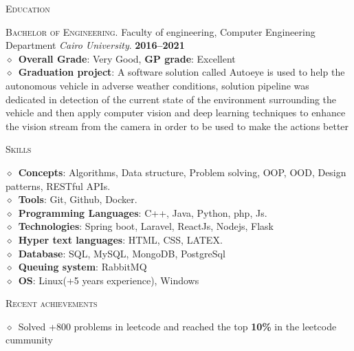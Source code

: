 \documentclass[11pt, a4paper]{article}
\newcommand{\dates}[1]{\hfill\mbox{\textbf{#1}}} %
\newcommand{\smaller}[1]{{\small$\diamond$\ #1}}
\newcommand{\headright}[1]{\vspace*{2.5ex}\textsc{\Large\color{secondColor}#1}\par%
     \vspace*{-2ex}{\color{secondColor}\hrulefill}\par}
\begin{document}
\begin{minipage}[t]{0.56\textwidth}
\headright{Education}
\textsc{Bachelor of Engineering.} Faculty of engineering, Computer Engineering Department \textit{Cairo University}.  \dates{2016--2021} \\
\smaller{\textbf{Overall Grade}: Very Good, \textbf{GP grade}: Excellent} \\
\smaller{\textbf{Graduation project}: A software solution called Autoeye is used to help the autonomous vehicle in adverse weather conditions, solution
pipeline was dedicated in detection of the current state of the environment surrounding the vehicle and then apply computer vision and
deep learning techniques to enhance the vision stream from the camera in order to be used to make the actions better}

\headright{Skills}
\smaller{\textbf{Concepts}: Algorithms, Data structure, Problem solving, OOP, OOD, Design patterns, RESTful APIs.} \\
\smaller{\textbf{Tools}: Git, Github, Docker.} \\
\smaller{\textbf{Programming Languages}: C++, Java, Python, php, Js.} \\
\smaller{\textbf{Technologies}: Spring boot, Laravel, ReactJs, Nodejs, Flask} \\
\smaller{\textbf{Hyper text languages}: HTML, CSS, LATEX.} \\ 
\smaller{\textbf{Database}: SQL, MySQL, MongoDB, PostgreSql} \\
\smaller{\textbf{Queuing system}: RabbitMQ} \\
\smaller{\textbf{OS}: Linux(+5 years experience), Windows}

\headright{Recent achievements}
\smaller{Solved +800 problems in leetcode and reached the top \textbf{10\%} in the leetcode cummunity} \\

\end{minipage}
\end{document}
